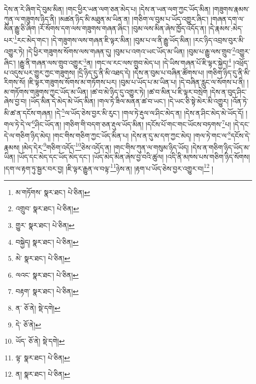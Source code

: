 དེས་ན་རེ་ཞིག་དེ་བུམ་མིན། །གང་ཕྱིར་ཡན་ལག་ཅན་མེད་པ། །དེས་ན་ཡན་ལག་ཀྱང་ཡོད་མིན། །གཟུགས་རྣམས་ཀུན་ལ་གཟུགས་ཉིད་ནི། །མཚན་ཉིད་མི་མཐུན་མ་ཡིན་ན། །གཅིག་ལ་བུམ་པ་ཡོད་འགྱུར་ཞིང་། །གཞན་དག་ལ་མིན་རྒྱུ་ཅི་ཞིག །རོ་སོགས་དག་ལས་གཟུགས་གཞན་ཞིང་། །བུམ་ལས་མིན་ཞེས་ཁྱོད་འདོད་ན། །དེ་རྣམས་:མེད་པར་\footnote{མ་གཏོགས་  སྣར་ཐང་།  པེ་ཅིན། }རང་མེད་གང་། །དེ་གཟུགས་ལས་གཞན་ཇི་ལྟར་མིན། །བུམ་པ་ལ་ནི་རྒྱུ་ཡོད་མིན། །རང་ཉིད་འབྲས་བུར་མི་འགྱུར་ཏེ། །དེ་ཕྱིར་གཟུགས་སོགས་ལས་གཞན་དུ། །བུམ་པ་འགའ་ཡང་ཡོད་མ་ཡིན། །བུམ་པ་རྒྱུ་ལས་གྲུབ་\footnote{འགྲུབ་  སྣར་ཐང་།  པེ་ཅིན། }འགྱུར་ཞིང་། །རྒྱུ་ནི་གཞན་ལས་གྲུབ་འགྱུར་\footnote{གྱུར་  སྣར་ཐང་།  པེ་ཅིན། }ན། །གང་ལ་རང་ལས་གྲུབ་མེད་པ། །དེ་ཡིས་གཞན་པོ་ཇི་ལྟར་སྐྱེད།\footnote{བསྐྱེད།  སྣར་ཐང་།  པེ་ཅིན། } །འཕྲོད་པ་འདུས་པར་གྱུར་ཀྱང་གཟུགས། །དྲི་ཉིད་དུ་ནི་མི་འཐད་དེ། །དེས་ན་བུམ་པ་བཞིན་ཚོགས་པ། །གཅིག་ཉིད་དུ་ནི་མི་རིགས་སོ། །ཇི་ལྟར་གཟུགས་སོགས་མ་གཏོགས་པར། །བུམ་པ་ཡོད་པ་མ་ཡིན་པ། །དེ་བཞིན་རླུང་ལ་སོགས་པ་ནི། །མ་གཏོགས་གཟུགས་ཀྱང་ཡོད་མ་ཡིན། །ཚ་བ་མེ་ཉིད་དུ་འགྱུར་ཏེ། །ཚ་བ་མིན་པ་ཇི་ལྟར་བསྲེག །དེས་ན་བུད་ཤིང་ཞེས་བྱ་བ། །ཡོད་མིན་དེ་མེད་མེ་ཡོད་མིན། །གལ་ཏེ་ཟིལ་མནན་ཚ་བ་ཡང་། །དེ་ཡང་ཅི་སྟེ་མེར་མི་འགྱུར། །འོན་ཏེ་མི་ཚ་ན་དངོས་གཞན། །དེ་\footnote{མེ་  སྣར་ཐང་།  པེ་ཅིན། }ལ་ཡོད་ཅེས་བྱར་མི་རུང་། །གལ་ཏེ་རྡུལ་ལ་ཤིང་མེད་ན། །དེས་ན་ཤིང་མེད་མེ་ཡོད་དོ། །གལ་ཏེ་དེ་ལ་\footnote{ལའང་  སྣར་ཐང་།  པེ་ཅིན། }ཤིང་ཡོད་ན། །གཅིག་གི་བདག་ཅན་རྡུལ་ཡོད་མིན། །དངོས་པོ་གང་གང་ཡོངས་བཏགས་\footnote{བརྟག་  སྣར་ཐང་།  པེ་ཅིན། }པ། །དེ་དང་དེ་ལ་གཅིག་ཉིད་མེད། །གང་གིས་གཅིག་ཀྱང་ཡོད་མིན་པ། །དེས་ན་དུ་མ་དག་ཀྱང་མེད། །གལ་ཏེ་གང་ལ་\footnote{ན་  ཅོ་ནེ།  སྡེ་དགེ། }དངོས་དེ་རྣམས། །མེད་དེར་\footnote{དེ་  ཅོ་ནེ། }གཅིག་འདོད་\footnote{ཡོད་  ཅོ་ནེ།  སྡེ་དགེ། }ཅེས་འདོད་ན། །གང་གིས་ཀུན་ལ་གསུམ་ཉིད་ཡོད། །དེས་ན་གཅིག་ཉིད་ཡོད་མ་ཡིན། །ཡོད་དང་མེད་དང་ཡོད་མེད་དང་། །ཡོད་མེད་མིན་ཞེས་བྱ་བའི་ཚུལ། །འདི་ནི་མཁས་པས་གཅིག་ཉིད་སོགས། །དག་ལ་རྟག་ཏུ་སྦྱར་བར་བྱ། །ཇི་ལྟར་རྒྱུན་ལ་བལྟ་\footnote{ལྟ་  སྣར་ཐང་།  པེ་ཅིན། }ཉེས་ན། །རྟག་པ་ཡོད་ཅེས་བྱར་འགྱུར་བ།\footnote{ན།  སྣར་ཐང་།  པེ་ཅིན། } །
